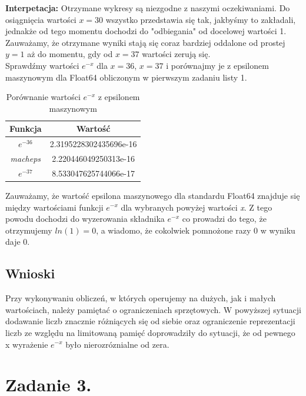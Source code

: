\documentclass[a4paper,14pt]{report}
\begin{document}
    \textbf{Interpetacja: } Otrzymane wykresy są niezgodne z naszymi oczekiwaniami. Do osiągnięcia wartości $x=30$ wszystko przedstawia się tak, jakbyśmy to zakładali, jednakże od tego momentu dochodzi do "odbiegania" od docelowej wartości 1. Zauważamy, że otrzymane wyniki stają się coraz bardziej oddalone od prostej $y=1$ aż do momentu, gdy od $x=37$ wartości zerują się. \\
    Sprawdźmy wartości $e^{-x}$ dla $x=36$, $x=37$ i porównajmy je z epsilonem maszynowym dla Float64 obliczonym w pierwszym zadaniu listy 1.
    \begin{table}[H]
    \centering
    \begin{tabular}{|c | c |} 
     \hline
     Funkcja & Wartość \\ [0.5ex] 
     \hline\hline
     $e^{-36} $ & 2.3195228302435696e-16\\
     \textit{macheps} & 2.220446049250313e-16 \\ 
     $e^{-37} $ & 8.533047625744066e-17\\
     \hline
    \end{tabular}
    \caption{Porównanie wartości $e^{-x}$ z epsilonem maszynowym}
    \label{Zad2Tabela}
    \end{table}
    Zauważamy, że wartość epsilona maszynowego dla standardu Float64 znajduje się między wartościami funkcji $e^{-x} $ dla wybranych powyżej wartości \textit{x}. Z tego powodu dochodzi do wyzerowania składnika $e^{-x}$ co prowadzi do tego, że otrzymujemy $ln(1)=0$, a wiadomo, że cokolwiek pomnożone razy 0 w wyniku daje 0.
  \section{Wnioski}
    Przy wykonywaniu obliczeń, w których operujemy na dużych, jak i małych wartościach, należy pamiętać o ograniczeniach sprzętowych. W powyższej sytuacji dodawanie liczb znacznie różniących się od siebie oraz ograniczenie reprezentacji liczb ze względu na limitowaną pamięć doprowadziły do sytuacji, że od pewnego x wyrażenie $e^{-x}$ było nierozróznialne od zera.
\chapter{Zadanie 3.}
\end{document}
